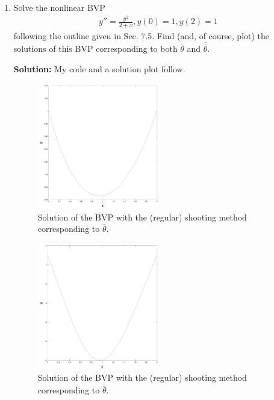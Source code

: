 \documentclass[11pt]{article}
\def\f{\frac }
\begin{document}
\begin{enumerate}
\item Solve the nonlinear BVP
\begin{align*} y'' = \f{y^2}{2+x}, y(0) = 1, y(2) = 1\end{align*}
following the outline given in Sec. 7.5.
Find (and, of course, plot) the solutions of this BVP corresponding to both $\overline{\theta}$ and $\overline{\overline{\theta}}$.

\bigskip
\textbf{Solution:} My code and a solution plot follow.



\begin{figure}[h!]
  \centering
    \includegraphics[width=0.5\textwidth]{andy_hw07_prb05_02.pdf}

  \caption{Solution of the BVP with the (regular) shooting method corresponding to $\overline{\theta}$.}
\end{figure}

\begin{figure}[h!]
  \centering
    \includegraphics[width=0.5\textwidth]{andy_hw07_prb05_01.pdf}
  \caption{Solution of the BVP with the (regular) shooting method corresponding to $\overline{\overline{\theta}}$.}
\end{figure}



\end{enumerate}
\end{document}
